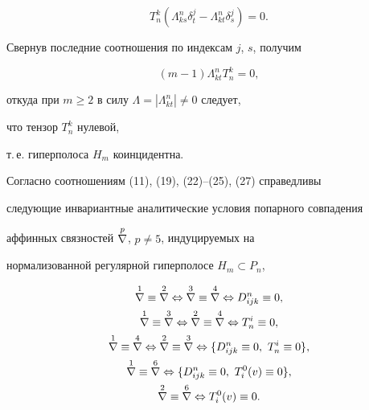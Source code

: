 $$ 


T^k_n(\Lambda^n_{k s}\delta^j_t-\Lambda^n_{k t}\delta^j_s)=0. 


$$ 


Свернув последние соотношения по индексам $j$, $s$, получим  


$$ 


(m-1)\Lambda^n_{k t}T^k_n=0, 


$$ 


откуда при $m\ge 2$ в силу $\Lambda=|\Lambda^n_{k t}|\ne 0$ следует, 


что тензор $T^k_n$ нулевой, 


т.\,е. гиперполоса $H_m$ коинцидентна. 


 


Согласно соотношениям (11), (19), (22)--(25), (27) справедливы  


следующие инвариантные аналитические условия попарного совпадения 


аффинных связностей $\overset{p}{\nabla}{}$, $p\ne 5$, индуцируемых на 


нормализованной регулярной гиперполосе $H_m\subset P_n$,


\begin{gather} 


\up{1}{\nabla}\equiv\up{2}{\nabla}\Leftrightarrow 


\up{3}{\nabla}\equiv\up{4}{\nabla}\Leftrightarrow 


D^n_{i j k}\equiv0,\\ 


\up{1}{\nabla}\equiv\up{3}{\nabla}\Leftrightarrow 


\up{2}{\nabla}\equiv\up{4}{\nabla}\Leftrightarrow 


T^i_n\equiv 0,\\ 


\up{1}{\nabla}\equiv\up{4}{\nabla}\Leftrightarrow 


\up{2}{\nabla}\equiv\up{3}{\nabla}\Leftrightarrow 


\{D^n_{i j k}\equiv 0,\ T^i_n\equiv 0\},\\ 


\up{1}{\nabla}\equiv\up{6}{\nabla}\Leftrightarrow 


\{D^n_{i j k}\equiv 0,\ T^0_i(v)\equiv 0\}, \\ 


\up{2}{\nabla}\equiv\up{6}{\nabla}\Leftrightarrow 


T^0_i(v)\equiv 0. 


\end{gather} 


